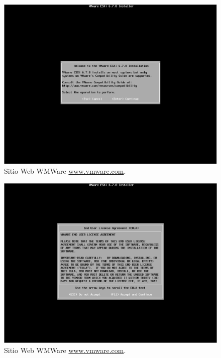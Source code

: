 \begin{figure}[!hbtp]
	\centering
	\includegraphics[width=\linewidth]{Trabajo/RecursosEducativos/RE01_VMwareESXi/RE_VMwareInstalacion05.png}
	\vspace{-0.2cm}
	\caption{Sitio Web WMWare \url{www.vmware.com}.\footnotemark[2]{} }
	\label{fig:VMwareInstalacion05}
\end{figure}

\begin{figure}[!hbtp]
	\centering
	\includegraphics[width=\linewidth]{Trabajo/RecursosEducativos/RE01_VMwareESXi/RE_VMwareInstalacion06.png}
	\vspace{-0.2cm}
	\caption{Sitio Web WMWare \url{www.vmware.com}.\footnotemark[2]{} }
	\label{fig:VMwareInstalacion06}
\end{figure}


